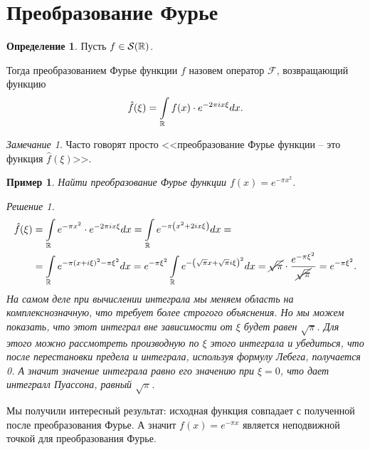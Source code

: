 \documentclass[a5paper, 10pt]{article}
\theoremstyle{definition}
\newtheorem{Def}{Определение}
\theoremstyle{plain}
\newtheorem{Ex}{Пример}
\theoremstyle{remark}
\newtheorem*{Note}{Замечание}
\newtheorem*{Solution}{Решение}
\begin{document}
    \section[12.05.2023]{Преобразование Фурье}
    \begin{Def}
    Пусть $f\in \mathcal{S}(\mathbb{R})$.

    Тогда преобразованием Фурье функции $f$ назовем оператор $\mathcal{F}$, возвращающий функцию
    \[
        \hat{f}(\xi) = \int\limits_{\mathbb{R}} f(x) \cdot e^{-2\pi i x \xi} dx.
    \] 
    \end{Def}
    \begin{Note}
    Часто говорят просто <<преобразование Фурье функции -- это функция $\hat{f}(\xi) $>>.
    \end{Note}
    
    \begin{Ex}
        Найти преобразование Фурье функции $f(x) = e^{-\pi x^2}$.

        \begin{Solution}
           \[
               \begin{split}
                   \hat{f}(\xi) &= \int\limits_{\mathbb{R}} e^{-\pi x^2} \cdot e^{-2\pi i x \xi} dx  = \int\limits_{\mathbb{R}} e^{-\pi\left(x^2 + 2ix\xi\right)} dx =\\
                                &= \int\limits_{\mathbb{R}} e^{-\pi\left(x+i\xi\right)^2 - \pi \xi^2} dx = e^{-\pi \xi^2} \int\limits_{\mathbb{R}} e^{-\left(\sqrt{\pi}x+\sqrt{\pi}i \xi\right)^2} dx = \cancel{\sqrt{\pi}} \cdot \frac{e^{-\pi \xi^2}}{\cancel{\sqrt{\pi}}} = e^{-\pi \xi^2}.
               \end{split}
           \]  
           На самом деле при вычислении интеграла мы меняем область на комплекснозначную, что требует более строгого объяснения. Но мы можем показать, что этот интеграл вне зависимости от $\xi$ будет равен $\sqrt{\pi}$. Для этого можно рассмотреть производную по $\xi$ этого интеграла и убедиться, что после перестановки предела и интеграла, используя формулу Лебега, получается 0. А значит значение интеграла равно его значению при $\xi=0$, что дает интегралл Пуассона, равный $\sqrt{\pi}$.
        \end{Solution}
    \end{Ex}

    Мы получили интересный результат: исходная функция совпадает с полученной после преобразования Фурье. А значит $f(x) = e^{-\pi x}$ является неподвижной точкой для преобразования Фурье.
    
\end{document}
